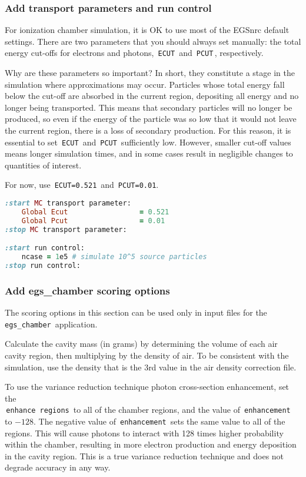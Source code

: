 \documentclass[12pt,twoside]{article}
\begin{document}
\subsubsection{Add transport parameters and run control}
For ionization chamber simulation, it is OK to use most of the EGSnrc default
settings. There are two parameters that you should always set manually:
the total energy cut-offs for electrons and photons, \,\Verb|ECUT|\,
and \,\Verb|PCUT|\,, respectively.

Why are these parameters so important? In short, they constitute a stage in the
simulation where approximations may occur. Particles whose total energy fall
below the cut-off are absorbed in the current region, depositing all energy
and no longer being transported. This means that secondary particles will no
longer be produced, so even if the energy of the particle was so low that it
would not leave the current region, there is a loss of secondary production. For
this reason, it is essential to set \,\Verb|ECUT|\, and \,\Verb|PCUT|\,
sufficiently low. However, smaller cut-off values means longer simulation times,
and in some cases result in negligible changes to quantities of interest.

For now, use \,\Verb|ECUT=0.521|\, and \,\Verb|PCUT=0.01|.

{\small
\begin{lstlisting}[language=ruby,backgroundcolor=\color{white}]
:start MC transport parameter:
    Global Ecut                 = 0.521
    Global Pcut                 = 0.01
:stop MC transport parameter:

:start run control:
    ncase = 1e5 # simulate 10^5 source particles
:stop run control:
\end{lstlisting}
}

\subsubsection{Add egs\_chamber scoring options}
The scoring options in this section can be used only in input files for the
\,\Verb|egs_chamber|\, application.

Calculate the cavity mass (in grams) by determining the volume of each air cavity region,
then multiplying by the density of air. To be consistent with the simulation,
use the density that is the 3rd value in the air density correction file.

To use the variance reduction technique photon cross-section enhancement, set
the \\
\,\Verb|enhance regions|\, to all of the chamber regions, and the value of
\,\Verb|enhancement|\, to $-128$. The negative value of \,\Verb|enhancement|\,
sets the same value to all of the regions. This will cause photons to interact
with 128 times higher probability within the chamber, resulting in more
electron production and energy deposition in the cavity region. This is a true
variance reduction technique and does not degrade accuracy in any way.
\end{document}

